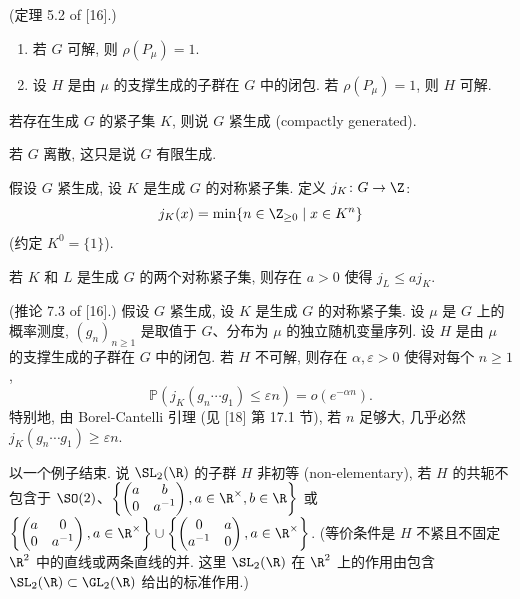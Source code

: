 \begin{theorem}[Kesten 判据]
\label{thm:VI.6.5.1}
(定理 5.2 of {[}16{]}.)
\begin{enumerate}
\item[(i)] 若 $G$ 可解, 则 $\rho(P_{\mu}) = 1$.
\item[(ii)] 设 $H$ 是由 $\mu$ 的支撑生成的子群在 $G$ 中的闭包. 若 $\rho(P_{\mu}) = 1$, 则 $H$ 可解.
\end{enumerate}
\end{theorem}

\begin{definition}
\label{def:VI.6.5.2}
若存在生成 $G$ 的紧子集 $K$, 则说 $G$ 紧生成 (compactly generated).
\end{definition}

若 $G$ 离散, 这只是说 $G$ 有限生成.

\begin{definition}[$j_K$]
\label{def:VI.6.5.3}
假设 $G$ 紧生成, 设 $K$ 是生成 $G$ 的对称紧子集. 定义 $j_K \colon G \to \Z$:
\[
j_K(x) = \min\{n \in \Z_{\geq 0} \mid x \in K^n\}
\]
(约定 $K^0 = \{1\}$).
\end{definition}

\begin{lemma}[$j_K$ 的等价性]
\label{lem:VI.6.5.4}
若 $K$ 和 $L$ 是生成 $G$ 的两个对称紧子集, 则存在 $a > 0$ 使得 $j_L \leq aj_K$.
\end{lemma}

\begin{corollary}[非可解群的逃逸速度]
\label{cor:VI.6.5.5}
(推论 7.3 of {[}16{]}.)
假设 $G$ 紧生成, 设 $K$ 是生成 $G$ 的对称紧子集. 设 $\mu$ 是 $G$ 上的概率测度, $(g_n)_{n \geq 1}$ 是取值于 $G$、分布为 $\mu$ 的独立随机变量序列.
设 $H$ 是由 $\mu$ 的支撑生成的子群在 $G$ 中的闭包. 若 $H$ 不可解, 则存在 $\alpha, \varepsilon > 0$ 使得对每个 $n \geq 1$,
\[
\mathbb{P}(j_K(g_n\cdots g_1) \leq \varepsilon n) = o(e^{-\alpha n}).
\]
特别地, 由 Borel-Cantelli 引理 (见 {[}18{]} 第 17.1 节), 若 $n$ 足够大, 几乎必然 $j_K(g_n\cdots g_1) \geq \varepsilon n$.
\end{corollary}

以一个例子结束. 说 $\SL_2(\R)$ 的子群 $H$ 非初等 (non-elementary), 若 $H$ 的共轭不包含于 $\SO(2)$、$\left\{\begin{pmatrix} a & b \\ 0 & a^{-1} \end{pmatrix}, a \in \R^{\times}, b \in \R\right\}$ 或 $\left\{\begin{pmatrix} a & 0 \\ 0 & a^{-1} \end{pmatrix}, a \in \R^{\times}\right\} \cup \left\{\begin{pmatrix} 0 & a \\ a^{-1} & 0 \end{pmatrix}, a \in \R^{\times}\right\}$. (等价条件是 $H$ 不紧且不固定 $\R^2$ 中的直线或两条直线的并. 这里 $\SL_2(\R)$ 在 $\R^2$ 上的作用由包含 $\SL_2(\R) \subset \GL_2(\R)$ 给出的标准作用.)

